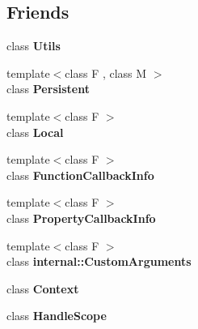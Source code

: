\subsection*{Friends}
\begin{DoxyCompactItemize}
\item 
\hypertarget{classv8_1_1_handle_abc0f7da619e9e72510dc07ed7b5ff6d8}{}class {\bfseries Utils}\label{classv8_1_1_handle_abc0f7da619e9e72510dc07ed7b5ff6d8}

\item 
\hypertarget{classv8_1_1_handle_ad845ec8872174be0a9ca9a3dd1898d30}{}{\footnotesize template$<$class F , class M $>$ }\\class {\bfseries Persistent}\label{classv8_1_1_handle_ad845ec8872174be0a9ca9a3dd1898d30}

\item 
\hypertarget{classv8_1_1_handle_afb872edb4aac7ba55f0da004113aa2b0}{}{\footnotesize template$<$class F $>$ }\\class {\bfseries Local}\label{classv8_1_1_handle_afb872edb4aac7ba55f0da004113aa2b0}

\item 
\hypertarget{classv8_1_1_handle_a76786e6fa2d0eac5e2d4f647659d0d23}{}{\footnotesize template$<$class F $>$ }\\class {\bfseries Function\+Callback\+Info}\label{classv8_1_1_handle_a76786e6fa2d0eac5e2d4f647659d0d23}

\item 
\hypertarget{classv8_1_1_handle_a5018adab21fade2b42f4f60e45fa1083}{}{\footnotesize template$<$class F $>$ }\\class {\bfseries Property\+Callback\+Info}\label{classv8_1_1_handle_a5018adab21fade2b42f4f60e45fa1083}

\item 
\hypertarget{classv8_1_1_handle_a07108678a2af25caab612879ed7dca62}{}{\footnotesize template$<$class F $>$ }\\class {\bfseries internal\+::\+Custom\+Arguments}\label{classv8_1_1_handle_a07108678a2af25caab612879ed7dca62}

\item 
\hypertarget{classv8_1_1_handle_ac26c806e60ca4a0547680edb68f6e39b}{}class {\bfseries Context}\label{classv8_1_1_handle_ac26c806e60ca4a0547680edb68f6e39b}

\item 
\hypertarget{classv8_1_1_handle_a5f127e488db492b05c8542cec0b880b7}{}class {\bfseries Handle\+Scope}\label{classv8_1_1_handle_a5f127e488db492b05c8542cec0b880b7}


\end{DoxyCompactItemize}
